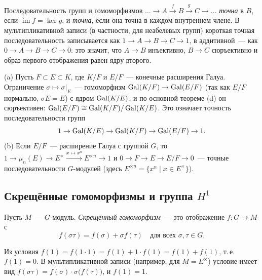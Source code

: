Последовательность групп и гомоморфизмов $\dots\to A\xrightarrow{f}B\xrightarrow{g}C\to\dots$ \emph{точна} в $B$, если
$\operatorname{im}f=\ker g$, и \emph{точна}, если она точна в каждом внутреннем члене. В мультипликативной записи
(в частности, для неабелевых групп) короткая точная последовательность записывается как $1\to A\to B\to C\to1$, в
аддитивной~--- как $0\to A\to B\to C\to0$: это значит, что $A\to B$ инъективно, $B\to C$ сюръективно и образ первого
отображения равен ядру второго.

\begin{example}[5.20a]
(a) Пусть $F\subset E\subset K$, где $K/F$ и $E/F$~--- конечные расширения Галуа. Ограничение $\sigma\mapsto\sigma|_E$~---
гомоморфизм $\operatorname{Gal}(K/F)\to\operatorname{Gal}(E/F)$ (так как $E/F$ нормально, $\sigma E=E$) с ядром $\operatorname{Gal}(K/E)$, и по основной теореме
(d) он сюръективен: $\operatorname{Gal}(E/F)\cong\operatorname{Gal}(K/F)/\operatorname{Gal}(K/E)$. Это означает точность последовательности групп
\[
1\to\operatorname{Gal}(K/E)\to\operatorname{Gal}(K/F)\to\operatorname{Gal}(E/F)\to1.
\]
(b) Если $E/F$~--- расширение Галуа с группой $G$, то $1\to\mu_n(E)\to E^\times\xrightarrow{x\mapsto x^n}E^{\times n}\to1$
и $0\to F\to E\to E/F\to0$~--- точные последовательности $G$-модулей (здесь $E^{\times n}=\{x^n\mid x\in E^\times\}$).
\end{example}

\subsection*{Скрещённые гомоморфизмы и группа $H^1$}

\begin{definition}
Пусть $M$~--- $G$-модуль. \emph{Скрещённый гомоморфизм}~--- это отображение $f\colon G\to M$ с
\[
f(\sigma\tau)=f(\sigma)+\sigma f(\tau)\quad\text{для всех }\sigma,\tau\in G.
\]
\end{definition}

Из условия $f(1)=f(1\cdot1)=f(1)+1\cdot f(1)=f(1)+f(1)$, т.\,е.\ $f(1)=0$. В мультипликативной записи (например, для
$M=E^\times$) условие имеет вид $f(\sigma\tau)=f(\sigma)\cdot\sigma\bigl(f(\tau)\bigr)$, и $f(1)=1$.

